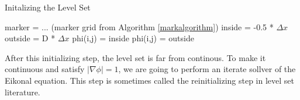 \begin{algorithm}
\caption{Initalizing the Level Set}
\begin{algorithmic}
\STATE marker = ... (marker grid from Algorithm \ref{markalgorithm})
\STATE inside = -0.5 * $\Delta x$
\STATE outside = D * $\Delta x$
\STATE phi(i,j) = inside
\ELSE
\STATE phi(i,j) = outside
\ENDIF
\ENDFOR
\ENDFOR
\end{algorithmic}
\label{particlestogridalgorithm2}
\end{algorithm}

After this initializing step, the level set is far from continous. To make it continuous and satisfy $|\nabla \phi| = 1$, we are going to perform an iterate sollver of the Eikonal equation. This step is sometimes called the reinitializing step in level set literature.
